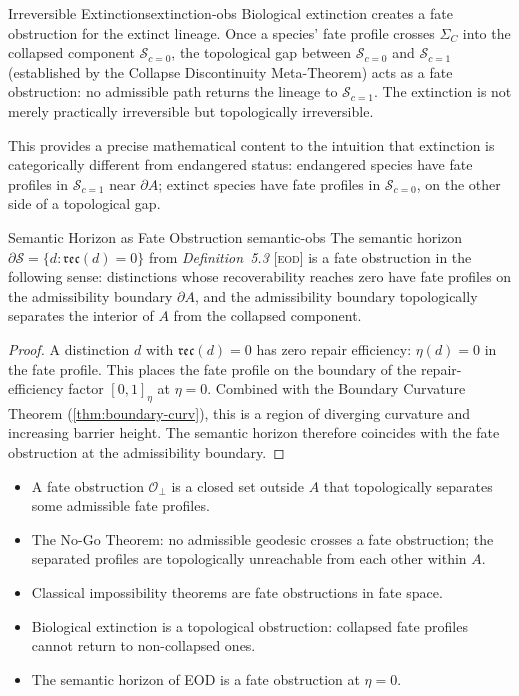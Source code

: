 \documentclass[12pt,twoside,openright]{book}
\newcommand{\reco}{\mathfrak{rec}}        %
\newcommand{\fateSpace}{\mathcal{S}}
\newcommand{\repEff}{\eta}               %
\newcommand{\collapseInd}{c}             %
\newcommand{\EOD}[1]{\textit{#1} [\textsc{eod}]}
\newcommand{\strataC}{\Sigma_{C}}   %
\newcommand{\admRegion}{A}
\newcommand{\fateComp}[1]{\fateSpace_{\collapseInd=#1}}
\newenvironment{chapsummary}{%
  \begin{tcolorbox}[colback=DistBlue!5,colframe=DistBlue,
    title={\faBookOpen\enspace Summary},
    fonttitle=\sffamily\bfseries\color{white},
    attach boxed title to top left={yshift=-2mm,xshift=4mm},
    boxed title style={colback=DistBlue,rounded corners}]
  \begin{itemize}[nosep,leftmargin=*]}{%
  \end{itemize}\end{tcolorbox}}
\providecommand{\strataC}{\Sigma_{C}}
\providecommand{\fateComp}[1]{\fateSpace_{\collapseInd=#1}}
\providecommand{\admRegion}{A}
\providecommand{\obstSet}{\mathcal{O}_{\perp}}
\begin{document}
\begin{remark}{Irreversible Extinctions}{extinction-obs}
Biological extinction creates a fate obstruction for the
extinct lineage. Once a species' fate profile crosses
$\strataC$ into the collapsed component $\fateComp{0}$, the
topological gap between $\fateComp{0}$ and $\fateComp{1}$
(established by the Collapse Discontinuity Meta-Theorem) acts
as a fate obstruction: no admissible path returns the lineage
to $\fateComp{1}$. The extinction is not merely practically
irreversible but topologically irreversible.

This provides a precise mathematical content to the intuition
that extinction is categorically different from endangered status:
endangered species have fate profiles in $\fateComp{1}$ near
$\partial\admRegion$; extinct species have fate profiles in
$\fateComp{0}$, on the other side of a topological gap.
\end{remark}

\begin{proposition}{Semantic Horizon as Fate Obstruction}%
  {semantic-obs}
The semantic horizon $\partial\mathcal{S}=\{d:\reco(d)=0\}$
from \EOD{Definition~5.3} is a fate obstruction in the
following sense: distinctions whose recoverability reaches
zero have fate profiles on the admissibility boundary
$\partial\admRegion$, and the admissibility boundary
topologically separates the interior of $\admRegion$ from the
collapsed component.
\begin{proof}
A distinction $d$ with $\reco(d)=0$ has zero repair efficiency:
$\repEff(d)=0$ in the fate profile. This places the fate
profile on the boundary of the repair-efficiency factor $[0,1]_\repEff$
at $\repEff=0$. Combined with the Boundary Curvature Theorem
(\cref{thm:boundary-curv}), this is a region of diverging
curvature and increasing barrier height. The semantic horizon
therefore coincides with the fate obstruction at the
admissibility boundary.
\end{proof}
\end{proposition}

\begin{chapsummary}
\item A fate obstruction $\obstSet$ is a closed set outside
  $\admRegion$ that topologically separates some admissible
  fate profiles.
\item The No-Go Theorem: no admissible geodesic crosses a
  fate obstruction; the separated profiles are topologically
  unreachable from each other within $\admRegion$.
\item Classical impossibility theorems are fate obstructions
  in fate space.
\item Biological extinction is a topological obstruction:
  collapsed fate profiles cannot return to non-collapsed ones.
\item The semantic horizon of EOD is a fate obstruction at
  $\repEff=0$.
\end{chapsummary}
\end{document}
